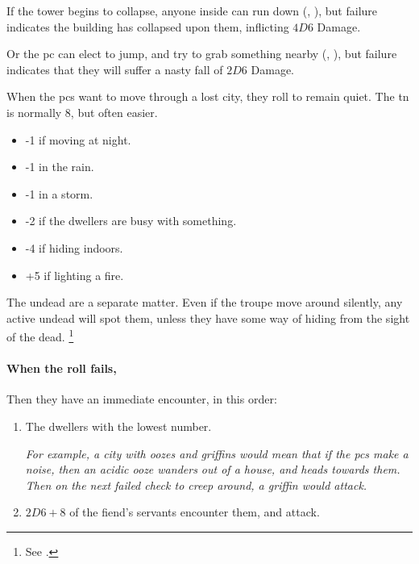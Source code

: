 \begin{multicols}{2}
\begin{dlist}
  If the tower begins to collapse, anyone inside can run down (, \tn[9]), but failure indicates the building has collapsed upon them, inflicting $4D6$ Damage.

  Or the \gls{pc} can elect to jump, and try to grab something nearby (, \tn[12]), but failure indicates that they will suffer a nasty fall of $2D6$ Damage.
\end{dlist}

\bigLine

\label{lostWhispers}

When the \glspl{pc} want to move through a lost city, they roll  to remain quiet.
The \gls{tn} is normally 8, but often easier.

\begin{itemize}
  \item
  -1 if moving at night.
  \item
  -1 in the rain.
  \item
  -1 in a storm.
  \item
  -2 if the dwellers are busy with something.
  \item
  -4 if hiding indoors.
  \item
  +5 if lighting a fire.
\end{itemize}

The undead are a separate matter.
Even if the troupe move around silently, any active undead will spot them, unless they have some way of hiding from the sight of the dead.%
\footnote{See .}

\paragraph{When the roll fails,}
\label{lostChase}

Then they have an immediate encounter, in this order:

\null
\begin{enumerate}
  \item
  The dwellers with the lowest number.

  \textit{For example, a city with oozes and griffins would mean that if the \glspl{pc} make a noise, then an acidic ooze wanders out of a house, and heads towards them.
  Then on the next failed check to creep around, a griffin would attack.}
  \item
  $2D6 + 8$ of the fiend's servants encounter them, and attack.


\end{enumerate}
\end{multicols}
